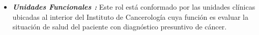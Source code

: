 \begin{enumerate}[label=\textbf{\arabic*})]
\begin{itemize}
		\item  \textbf{\textit{Unidades Funcionales :}}  Este rol está conformado por las unidades clínicas ubicadas al interior del Instituto  de Cancerología cuya función es evaluar la situación de salud del paciente con diagnóstico presuntivo de cáncer. 
	\end{itemize}
	
\end{enumerate}